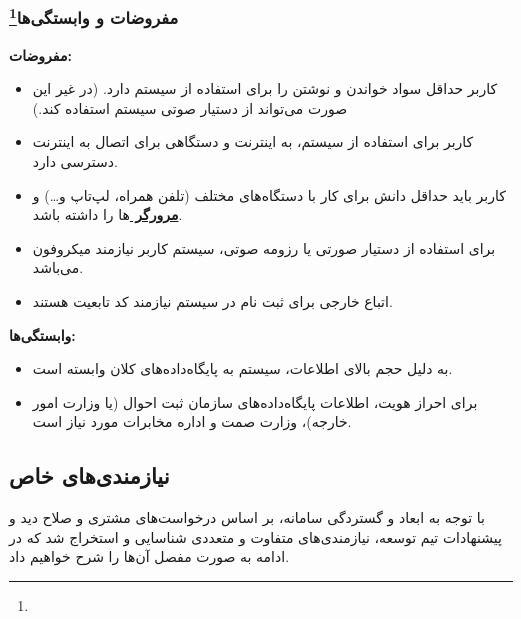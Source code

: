 \documentclass[12pt]{article}
\begin{document}
	\subsubsection{مفروضات و وابستگی‌ها\footnote{}}
	\textbf{مفروضات:}
	\begin{itemize}
		\item
		کاربر حداقل سواد خواندن و نوشتن را برای استفاده از سیستم دارد. (در غیر این صورت می‌تواند از دستیار صوتی سیستم استفاده کند.)
		\item
		کاربر برای استفاده از سیستم، به اینترنت و دستگاهی برای اتصال به اینترنت دسترسی دارد.
		\item
		کاربر باید حداقل دانش برای کار با دستگاه‌های مختلف (تلفن همراه، لپ‌تاپ و…) و \textbf{\hyperref[ref:browser]{مرورگر }}ها را داشته باشد.
		\item
		برای استفاده از دستیار صورتی یا رزومه صوتی، سیستم کاربر نیازمند میکروفون می‌باشد.
		\item
		اتباع خارجی برای ثبت نام در سیستم نیازمند کد تابعیت هستند.
	\end{itemize}
	\textbf{وابستگی‌ها:}
	\begin{itemize}
		\item
		به دلیل حجم بالای اطلاعات، سیستم به پایگاه‌داده‌های کلان وابسته است.
		\item
		برای احراز هویت، اطلاعات پایگاه‌داده‌های سازمان ثبت احوال (یا وزارت امور خارجه)، وزارت صمت و اداره مخابرات مورد‌ نیاز است.
	\end{itemize}

	\newpage
	\subsection{نیازمندی‌های خاص}
	با توجه به ابعاد و گستردگی سامانه، بر اساس درخواست‌های مشتری و صلاح دید و پیشنهادات تیم توسعه، نیازمندی‌های متفاوت و متعددی شناسایی و استخراج شد که در ادامه به صورت مفصل آن‌ها را شرح خواهیم داد.
\end{document}
